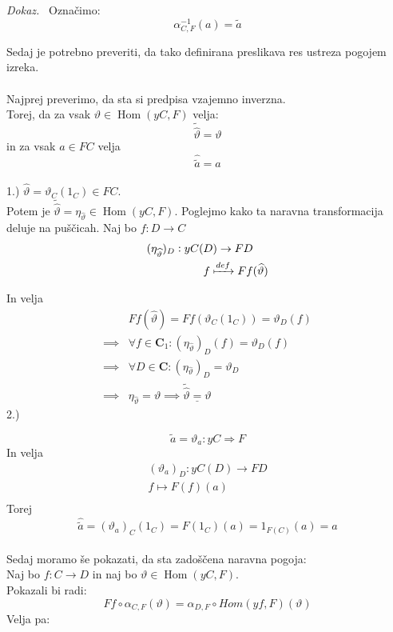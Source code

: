 \documentclass[12pt,a4paper]{book}
\theoremstyle{definition}
\theoremstyle{plain}
\newenvironment{dokaz}{\emph{Dokaz.}\ }{\hspace{\fill}{$\Box$}}
\theoremstyle{definition}
\theoremstyle{remark}
\DeclareMathOperator{\Hom}{Hom}
\begin{document}
\begin{dokaz}
Označimo:
\begin{equation}
\boxed{\alpha^{-1}_{C,F}(a) = \widetilde{a}}
\end{equation}

Sedaj je potrebno preveriti, da tako definirana preslikava res ustreza pogojem izreka. \\
\\
Najprej preverimo, da sta si predpisa vzajemno inverzna. \\
Torej, da za vsak $\vartheta \in \Hom(yC,F)$ velja: 
$$\widetilde{\widehat{\vartheta}} = \vartheta$$
in za vsak $a \in FC$ velja
$$\widehat{\widetilde{a}} = a$$
\\ 1.)
$\widehat{\vartheta} = \vartheta_C(1_C) \in FC$. \\
Potem je $\widetilde{\widehat{\vartheta}} = \eta_{\widehat{\vartheta}} \in \Hom(yC,F)$. Poglejmo kako ta naravna transformacija deluje na puščicah. Naj bo $f : D \to C$
\begin{align*}
(\eta_{\widehat{\vartheta}})_D : yC(&D) \to FD \\
&f \xmapsto{def} Ff(\widehat{\vartheta}) \\
\end{align*}

In velja
\begin{align*}
&Ff(\widehat{\vartheta}) = Ff(\vartheta_C(1_C)) = \vartheta_D(f) \\
\implies& \forall f \in \textbf{C}_1  : (\eta_{\widehat{\vartheta}})_D(f) = \vartheta_D(f) \\
\implies& \forall D \in \textbf{C} : (\eta_{\widehat{\vartheta}})_D = \vartheta_D \\
\implies& \eta_{\widehat{\vartheta}} = \vartheta
\implies \underline{\widetilde{\widehat{\vartheta}} = \vartheta}
\end{align*}
2.) 

$$\widetilde{a} = \vartheta_a : yC \Rightarrow F$$
In velja
\begin{align*}
(\vartheta_a)_D : yC(D) \to FD \\
f \mapsto F(f)(a) \\
\end{align*}
Torej
$$\widehat{\widetilde{a}} = (\vartheta_a)_C(1_C) = F(1_C)(a) = 1_{F(C)}(a) = a$$
\\
Sedaj moramo še pokazati, da sta zadoščena naravna pogoja: \\
Naj bo $f : C \to D$ in naj bo $\vartheta \in \Hom(yC,F)$. \\
Pokazali bi radi:
\begin{equation}
Ff \circ \alpha_{C,F}(\vartheta) = \alpha_{D,F} \circ Hom(yf,F)(\vartheta)
\end{equation}
Velja pa:


\end{dokaz}
\end{document}
